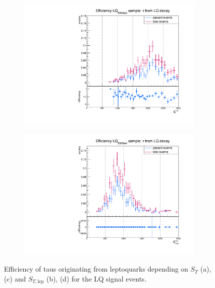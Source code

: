 \begin{figure}
\begin{subfigure}[t]{0.49\textwidth}
                \label{DividedFromLQ:signal:STlepLQ75}
                \end{subfigure}
                \begin{subfigure}[t]{0.49\textwidth}
                \includegraphics[width=\textwidth]{figures/plots/LQ76/Divided_fromLQST.pdf}
                \label{DividedFromLQ:signal:STLQ76}
                \end{subfigure}
                \begin{subfigure}[t]{0.49\textwidth}
                \includegraphics[width=\textwidth]{figures/plots/LQ76/Divided_fromLQSTlep.pdf}
                \label{DividedFromLQ:signal:STlepLQ76}
                \end{subfigure}
\caption[Efficiency of taus originating from leptoquarks for the LQ signal events.]{Efficiency of taus originating from leptoquarks depending on $S_{T}$ (a), (c) and $S_{T,\text{lep}}$ (b), (d) for the LQ signal events.}
\label{DividedFromLQ:signal:STgedöns}
\end{figure}
